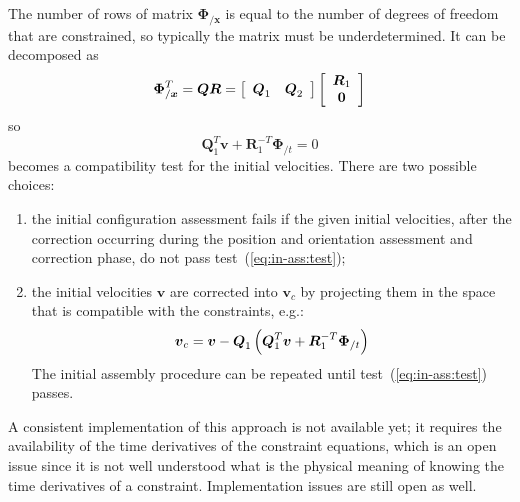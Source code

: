 \documentclass[10pt,dvips,fleqn,subeqn]{report}
\newcommand{\T}[1]{\boldsymbol{#1}}
\begin{document}
The number of rows of matrix $\T{\Phi}_{/\T{x}}$ is equal to the number 
of degrees of freedom that are constrained, so typically the matrix 
must be underdetermined.
It can be decomposed as
\begin{equation}
	\T{\Phi}_{/\T{x}}^T = \T{Q} \T{R}
		= \sqbr{\matr{cc}{\T{Q}_1 & \T{Q}_2}}\sqbr{\cvvect{\T{R}_1 \\ \T{0}}}
\end{equation}
so
\begin{equation}
	\T{Q}_1^T \T{v} + \T{R}_1^{-T} \T{\Phi}_{/t} = 0
	\label{eq:in-ass:test}
\end{equation}
becomes a compatibility test for the initial velocities.
There are two possible choices:
\begin{enumerate}
\item the initial configuration assessment fails if the given 
initial velocities, after the correction occurring during the position 
and orientation assessment and correction phase, do not pass 
test~(\ref{eq:in-ass:test});
\item the initial velocities $\T{v}$ are corrected into $\T{v}_c$ 
by projecting them in the space that is compatible with the constraints, 
e.g.:
\begin{equation}
	\T{v}_c = \T{v} - \T{Q}_1 \plbr{\T{Q}_1^T \T{v} + \T{R}_1^{-T}\T{\Phi}_{/t}}
\end{equation}
The initial assembly procedure can be repeated until 
test~(\ref{eq:in-ass:test}) passes.
\end{enumerate}
A consistent implementation of this approach is not available yet;
it requires the availability of the time derivatives 
of the constraint equations, which is an open issue since it is not
well understood what is the physical meaning of knowing 
the time derivatives of a constraint.
Implementation issues are still open as well.
\end{document}
